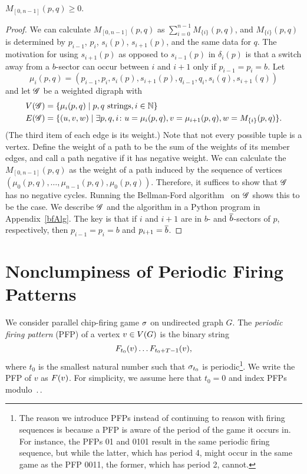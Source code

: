 \begin{thm}\label{morale}
$M_{[0,n-1]}(p,q) \geq 0$.
\end{thm}

\begin{proof}
We can calculate $M_{[0,n-1]}(p,q)$ as $\sum_{i=0}^{n-1}M_{\{i\}}(p,q)$, and
$M_{\{i\}}(p,q)$ is determined by $p_{i-1}$, $p_i$, $s_i(p)$, $s_{i+1}(p)$, and
the same data for $q$. The motivation for using $s_{i+1}(p)$ as opposed to
$s_{i-1}(p)$ in $\delta_i(p)$ is that a switch away from a $b$-sector can occur
between $i$ and $i+1$ only if $p_{i-1} = p_i = b$. Let
\[
  \mu_i(p,q) = (p_{i-1},p_i,s_i(p),s_{i+1}(p),q_{i-1},q_i,s_i(q),s_{i+1}(q))
\]
and let $\mathscr{G}$ be a weighted digraph with
\begin{align*}
  \V[\G] &= \set{\mu_i(p,q)}{p,q \text{ strings}, i \in \nats} \\
  \E[\G] &= \set{(u,v,w)}{\exists p,q,i\colon
    u = \mu_i(p,q),
    v = \mu_{i+1}(p,q),
    w = M_{\{i\}}(p,q)}.
\end{align*}
(The third item of each edge is its weight.) Note that not every possible tuple
is a vertex. Define the weight of a path to be the sum of the weights of its
member edges, and call a path negative if it has negative weight. We can
calculate the $M_{[0,n-1]}(p,q)$ as the weight of a path induced by the
sequence of vertices $(\mu_0(p,q), \dots, \mu_{n-1}(p,q),
\mu_0(p,q))$. Therefore, it suffices to show that $\mathscr{G}$ has no negative
cycles. Running the Bellman-Ford algorithm~\cite{bellmanford} on $\mathscr{G}$ shows
this to be the case. We describe $\mathscr{G}$ and the algorithm in a Python program in
Appendix~\ref{bfAlg}. The key is that if $i$ and $i+1$ are in $b$- and
$\overline{b}$-sectors of $p$, respectively, then $p_{i-1} = p_i = b$ and $p_{i+1} =
\overline{b}$.
\end{proof}

\section{Nonclumpiness of Periodic Firing Patterns}\label{nonclumpiness}
We consider parallel chip-firing game $\sigma$ on undirected graph $G$. The
\emph{periodic firing pattern} (PFP) of a vertex $v \in V(G)$ is the binary
string
\[
  \firing{v}{t_0}\dots\firing{v}{t_0 + \period - 1},
\]
where $t_0$ is the smallest natural number such that $\sigma_{t_0}$ is
periodic\footnote{The reason we introduce PFPs instead of continuing to reason
  with firing sequences is because a PFP is aware of the period of the game it
  occurs in. For instance, the PFPs 01 and 0101 result in the same periodic
  firing sequence, but while the latter, which has period 4, might occur in the
  same game as the PFP 0011, the former, which has period 2, cannot.}. We write
the PFP of $v$ as $\pfp{v}$. For simplicity, we assume here that $t_0 = 0$ and
index PFPs modulo $\period$.

